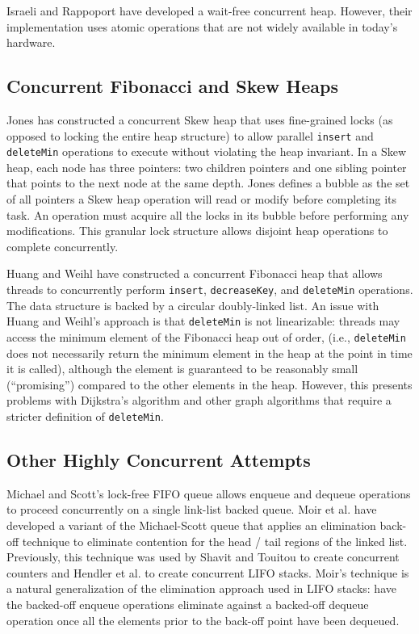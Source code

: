 \documentclass{acm_proc_article-sp}
\begin{document}
Israeli and Rappoport have developed \cite{israeli93} a wait-free
concurrent heap. However, their implementation uses atomic operations
that are not widely available in today's hardware.

\subsection{Concurrent Fibonacci and Skew Heaps}
Jones \cite{jones89} has constructed a concurrent Skew heap that uses fine-grained
locks (as opposed to locking the entire heap structure) to allow parallel \texttt{insert} and \texttt{deleteMin} operations to execute
without violating the heap invariant. In a Skew heap, each node has three pointers:
two children pointers and one sibling pointer that points to the next node at the same
depth. Jones defines a bubble as the set of all pointers a Skew heap
operation will read or modify before completing its task. An operation must
acquire all the locks in its bubble before performing any modifications. This
granular lock structure allows disjoint heap operations to complete concurrently.

Huang and Weihl \cite{huang91} have constructed a concurrent Fibonacci heap
that allows threads to concurrently perform \texttt{insert}, \texttt{decreaseKey}, and
\texttt{deleteMin} operations. The data structure is backed by a circular doubly-linked
list. An issue with Huang and Weihl's approach is that \texttt{deleteMin} is not
linearizable: threads may access the minimum element of the Fibonacci heap out of
order, (i.e., \texttt{deleteMin} does not necessarily return the minimum element in the heap at
the point in time it is called), although the element is guaranteed to be reasonably small (``promising'') compared to the other
elements in the heap. However, this presents problems with Dijkstra's algorithm and other
graph algorithms that require a stricter definition of \texttt{deleteMin}.

\subsection{Other Highly Concurrent Attempts}
Michael and Scott's \cite{michael96} lock-free FIFO queue allows enqueue
and dequeue operations to proceed concurrently on a
single link-list backed queue. Moir et al. have developed
\cite{moir05} a variant of the Michael-Scott queue that applies
an elimination back-off technique to eliminate contention for the
head / tail regions of the linked list. Previously, this
technique was used by Shavit and Touitou \cite{shavit97} to create
concurrent counters and Hendler et al.  \cite{hendler04} to create concurrent LIFO
stacks. Moir's technique is a natural generalization of the elimination
approach used in LIFO stacks: have the backed-off enqueue operations
eliminate against a backed-off dequeue operation once all the elements prior
to the back-off point have been dequeued.
\end{document}
